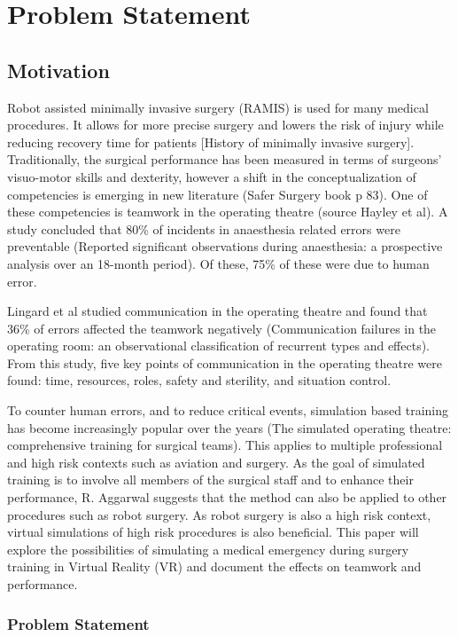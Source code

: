 \chapter*{Problem Statement}

\section*{Motivation}
Robot assisted minimally invasive surgery (RAMIS) is used for many medical procedures. It allows for more precise surgery and lowers the risk of injury while reducing recovery time for patients [History of minimally invasive surgery]. Traditionally, the surgical performance has been measured in terms of surgeons' visuo-motor skills and dexterity, however a shift in the conceptualization of competencies is emerging in new literature (Safer Surgery book p 83). One of these competencies is teamwork in the operating theatre (source Hayley et al). A study concluded that 80\% of incidents in anaesthesia related errors were preventable (Reported significant observations during anaesthesia: a prospective analysis over an 18-month period). Of these, 75\% of these were due to human error. 

Lingard et al studied communication in the operating theatre and found that 36\% of errors affected the teamwork negatively (Communication failures in the operating room: an observational classification of recurrent types and effects). From this study, five key points of communication in the operating theatre were found: time, resources, roles, safety and sterility, and situation control.


To counter human errors, and to reduce critical events, simulation based training has become increasingly popular over the years (The simulated operating theatre: comprehensive training for surgical teams). This applies to multiple professional and high risk contexts such as aviation and surgery. As the goal of simulated training is to involve all members of the surgical staff and to enhance their performance, R. Aggarwal suggests that the method can also be applied to other procedures such as robot surgery. As robot surgery is also a high risk context, virtual simulations of high risk procedures is also beneficial. 
This paper will explore the possibilities of simulating a medical emergency during surgery training in Virtual Reality (VR) and document the effects on teamwork and performance. 

\subsection*{Problem Statement}

